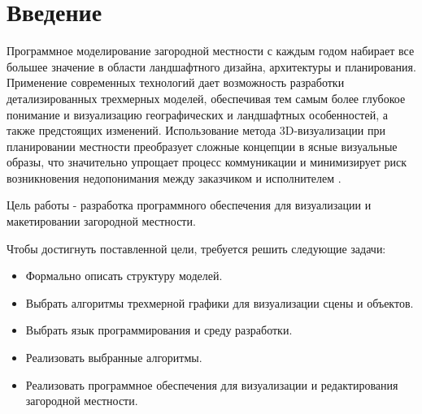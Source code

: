 \chapter*{Введение}

Программное моделирование загородной местности с каждым годом набирает все большее значение в области ландшафтного дизайна, архитектуры и планирования. Применение современных технологий дает возможность разработки детализированных трехмерных моделей, обеспечивая тем самым более глубокое понимание и визуализацию географических и ландшафтных особенностей, а также предстоящих изменений. Использование метода 3D-визуализации при планировании местности преобразует сложные концепции в ясные визуальные образы, что значительно упрощает процесс коммуникации и минимизирует риск возникновения недопонимания между заказчиком и исполнителем \cite{intro_visualization}.
 
 
Цель работы - разработка программного обеспечения для визуализации и макетировании загородной местности. %

Чтобы достигнуть поставленной цели, требуется решить следующие задачи:
\begin{itemize}
    \item Формально описать структуру моделей.
    \item Выбрать алгоритмы трехмерной графики для визуализации сцены и объектов.
    \item Выбрать язык программирования и среду разработки.
    \item Реализовать выбранные алгоритмы.
    \item Реализовать программное обеспечения для визуализации и редактирования загородной местности. %
\end{itemize}
